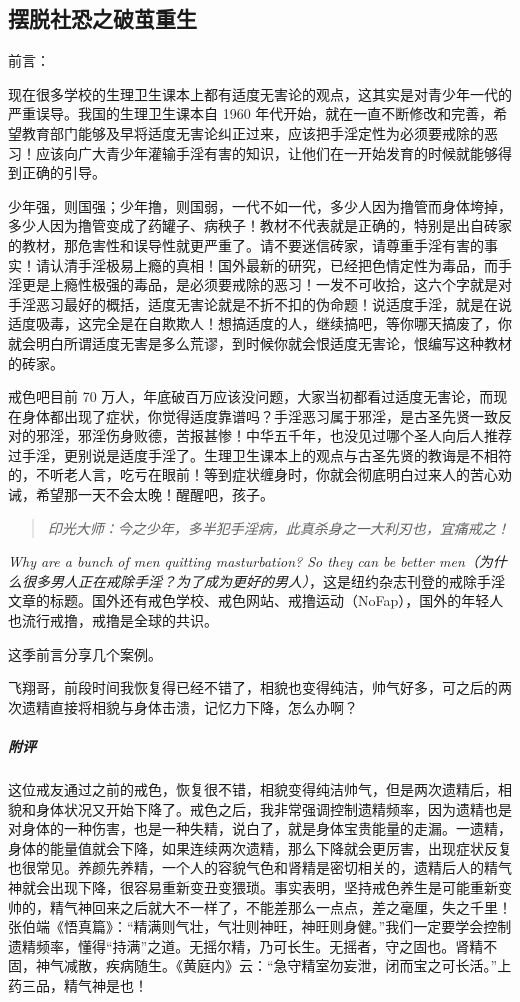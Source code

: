 \subsection{摆脱社恐之破茧重生}

前言：

现在很多学校的生理卫生课本上都有适度无害论的观点，这其实是对青少年一代的严重误导。我国的生理卫生课本自 1960 年代开始，就在一直不断修改和完善，希望教育部门能够及早将适度无害论纠正过来，应该把手淫定性为必须要戒除的恶习！应该向广大青少年灌输手淫有害的知识，让他们在一开始发育的时候就能够得到正确的引导。

少年强，则国强；少年撸，则国弱，一代不如一代，多少人因为撸管而身体垮掉，多少人因为撸管变成了药罐子、病秧子！教材不代表就是正确的，特别是出自砖家的教材，那危害性和误导性就更严重了。请不要迷信砖家，请尊重手淫有害的事实！请认清手淫极易上瘾的真相！国外最新的研究，已经把色情定性为毒品，而手淫更是上瘾性极强的毒品，是必须要戒除的恶习！一发不可收拾，这六个字就是对手淫恶习最好的概括，适度无害论就是不折不扣的伪命题！说适度手淫，就是在说适度吸毒，这完全是在自欺欺人！想搞适度的人，继续搞吧，等你哪天搞废了，你就会明白所谓适度无害是多么荒谬，到时候你就会恨适度无害论，恨编写这种教材的砖家。

戒色吧目前 70 万人，年底破百万应该没问题，大家当初都看过适度无害论，而现在身体都出现了症状，你觉得适度靠谱吗？手淫恶习属于邪淫，是古圣先贤一致反对的邪淫，邪淫伤身败德，苦报甚惨！中华五千年，也没见过哪个圣人向后人推荐过手淫，更别说是适度手淫了。生理卫生课本上的观点与古圣先贤的教诲是不相符的，不听老人言，吃亏在眼前！等到症状缠身时，你就会彻底明白过来人的苦心劝诫，希望那一天不会太晚！醒醒吧，孩子。

\begin{quote}\it
    印光大师：今之少年，多半犯手淫病，此真杀身之一大利刃也，宜痛戒之！
\end{quote}

\textit{Why are a bunch of men quitting masturbation? So they can be better men（为什么很多男人正在戒除手淫？为了成为更好的男人）}，这是纽约杂志刊登的戒除手淫文章的标题。国外还有戒色学校、戒色网站、戒撸运动（NoFap），国外的年轻人也流行戒撸，戒撸是全球的共识。

这季前言分享几个案例。

\begin{case}
    飞翔哥，前段时间我恢复得已经不错了，相貌也变得纯洁，帅气好多，可之后的两次遗精直接将相貌与身体击溃，记忆力下降，怎么办啊？
    \subparagraph{附评} 这位戒友通过之前的戒色，恢复很不错，相貌变得纯洁帅气，但是两次遗精后，相貌和身体状况又开始下降了。戒色之后，我非常强调控制遗精频率，因为遗精也是对身体的一种伤害，也是一种失精，说白了，就是身体宝贵能量的走漏。一遗精，身体的能量值就会下降，如果连续两次遗精，那么下降就会更厉害，出现症状反复也很常见。养颜先养精，一个人的容貌气色和肾精是密切相关的，遗精后人的精气神就会出现下降，很容易重新变丑变猥琐。事实表明，坚持戒色养生是可能重新变帅的，精气神回来之后就大不一样了，不能差那么一点点，差之毫厘，失之千里！张伯端《悟真篇》：“精满则气壮，气壮则神旺，神旺则身健。”我们一定要学会控制遗精频率，懂得“持满”之道。无摇尔精，乃可长生。无摇者，守之固也。肾精不固，神气减散，疾病随生。《黄庭内》云：“急守精室勿妄泄，闭而宝之可长活。”上药三品，精气神是也！
\end{case}

